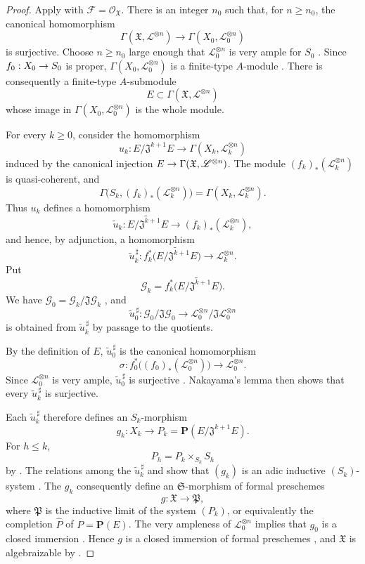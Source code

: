 \documentclass[oneside]{amsart}
\theoremstyle{ega-env-style}
\theoremstyle{ega-thm-env-style}
\theoremstyle{ega-defn-env-style}
\def\mathcal{\mathscr}
\def\sh{\mathcal}                   %
\def\leq{\leqslant}                 %
\def\geq{\geqslant}                 %
\renewcommand{\to}{\mathchoice{\longrightarrow}{\rightarrow}{\rightarrow}{\rightarrow}}
\begin{document}
\begin{proof}
Apply  with
$\sh{F}=\sh{O}_{\mathfrak{X}}$.  There is an integer $n_0$ such
that, for $n\geq n_0$, the canonical homomorphism
\[
  \Gamma(\mathfrak{X},\sh{L}^{\otimes n})
  \longrightarrow
  \Gamma(X_0,\sh{L}_0^{\otimes n})
\]
is surjective.  Choose $n\geq n_0$ large enough that
$\sh{L}_0^{\otimes n}$ is very ample for $S_0$
.  Since
$f_0:X_0\to S_0$ is proper,
$\Gamma(X_0,\sh{L}_0^{\otimes n})$ is a finite-type $A$-module
.  There is consequently a finite-type
$A$-submodule
\[
  E\subset\Gamma(\mathfrak{X},\sh{L}^{\otimes n})
\]
whose image in $\Gamma(X_0,\sh{L}_0^{\otimes n})$ is the whole
module.

For every $k\geq0$, consider the homomorphism
\[
  u_k:
  E/\mathfrak{J}^{k+1}E
  \longrightarrow
  \Gamma(X_k,\sh{L}_k^{\otimes n})
\]
induced by the canonical injection
$E\to\Gamma(\mathfrak{X},\sh{L}^{\otimes n})$.  The module
$(f_k)_*(\sh{L}_k^{\otimes n})$ is quasi-coherent, and
\[
  \Gamma\bigl(S_k,(f_k)_*(\sh{L}_k^{\otimes n})\bigr)
  =
  \Gamma(X_k,\sh{L}_k^{\otimes n}).
\]
Thus $u_k$ defines a homomorphism
\[
  \widetilde{u}_k:
  \widetilde{E/\mathfrak{J}^{k+1}E}
  \longrightarrow
  (f_k)_*(\sh{L}_k^{\otimes n}),
\]
and hence, by adjunction, a homomorphism
\[
  \widetilde{u}_k^{\,\sharp}:
  f_k^*\bigl(\widetilde{E/\mathfrak{J}^{k+1}E}\bigr)
  \longrightarrow
  \sh{L}_k^{\otimes n}.
\]
Put
\[
  \sh{G}_k=
  f_k^*\bigl(\widetilde{E/\mathfrak{J}^{k+1}E}\bigr).
\]
We have
$\sh{G}_0=\sh{G}_k/\mathfrak{J}\sh{G}_k$
, and
\[
  \widetilde{u}_0^{\,\sharp}:
  \sh{G}_0/\mathfrak{J}\sh{G}_0
  \longrightarrow
  \sh{L}_0^{\otimes n}/
  \mathfrak{J}\sh{L}_0^{\otimes n}
\]
is obtained from $\widetilde{u}_k^{\,\sharp}$ by passage to the
quotients.

By the definition of $E$, $\widetilde{u}_0^{\,\sharp}$ is the
canonical homomorphism
\[
  \sigma:
  f_0^*\bigl((f_0)_*(\sh{L}_0^{\otimes n})\bigr)
  \longrightarrow
  \sh{L}_0^{\otimes n}.
\]
Since $\sh{L}_0^{\otimes n}$ is very ample,
$\widetilde{u}_0^{\,\sharp}$ is surjective
.  Nakayama's lemma then shows that every
$\widetilde{u}_k^{\,\sharp}$ is surjective.

Each $\widetilde{u}_k^{\,\sharp}$ therefore defines
 an $S_k$-morphism
\[
  g_k:X_k\longrightarrow
  P_k=\mathbf{P}(E/\mathfrak{J}^{k+1}E).
\]
For $h\leq k$,
\[
  P_h=P_k\times_{S_k}S_h
\]
by .  The relations among the
$\widetilde{u}_k^{\,\sharp}$ and  show that
$(g_k)$ is an adic inductive $(S_k)$-system
.  The $g_k$ consequently define an
$\mathfrak{S}$-morphism of formal preschemes
\[
  g:\mathfrak{X}\longrightarrow\mathfrak{P},
\]
where $\mathfrak{P}$ is the inductive limit of the system $(P_k)$,
or equivalently the completion $\widehat{P}$ of
$P=\mathbf{P}(E)$.  The very ampleness of
$\sh{L}_0^{\otimes n}$ implies that $g_0$ is a closed immersion
.  Hence $g$ is a closed immersion of formal
preschemes , and $\mathfrak{X}$ is algebraizable
by .


\end{proof}
\end{document}
